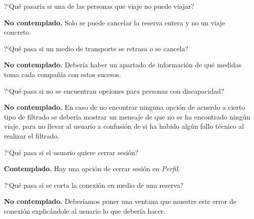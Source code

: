\begin{escenario} %
    \centering
    ?`Qué pasaría si una de las personas que viaje no puede viajar?

    \begin{solucion}
        \centering
        \textbf{No contemplado.} Solo se puede cancelar la reserva entera y no un viaje concreto.
    \end{solucion}
\end{escenario}

\begin{escenario} %
    \centering
    ?`Qué pasa si un medio de transporte se retrasa o se cancela?

    \begin{solucion}
        \centering
        \textbf{No contemplado.} Debería haber un apartado de información de qué medidas toma cada compañía con estos sucesos.
    \end{solucion}
\end{escenario}

\begin{escenario} %
    \centering
    ?`Qué pasa si no se encuentran opciones para personas con discapacidad?

    \begin{solucion}
        \centering
        \textbf{No contemplado.} En caso de no encontrar ninguna opción de acuerdo a cierto tipo de
        filtrado se debería mostrar un mensaje de que no se ha encontrado ningún viaje, para no
        llevar al usuario a confusión de si ha habido algún fallo técnico al realizar el filtrado.
    \end{solucion}
\end{escenario}

\begin{escenario} %
    \centering
    ?`Qué pasa si el usuario quiere cerrar sesión?

    \begin{solucion}
        \centering
        \textbf{Contemplado.} Hay una opción de cerrar sesión en \textit{Perfil}.
    \end{solucion}
\end{escenario}

\begin{escenario} %
    \centering
    ?`Qué pasa si se corta la conexión en medio de una reserva?

    \begin{solucion}
        \centering
        \textbf{No contemplado.} Deberíamos poner una ventana que muestre este error de conexión explicándole al usuario lo que debería hacer.
    \end{solucion}
\end{escenario}